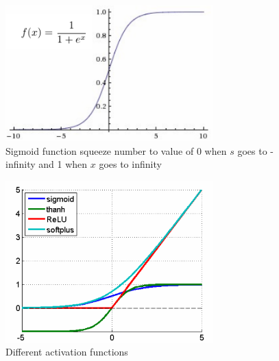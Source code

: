 \documentclass[conference]{IEEEtran}
\begin{document}
\begin{figure}[H]
    \centering
    \includegraphics[width=8cm]{sigmoid}
    \caption{Sigmoid function squeeze number to value of 0 when $s$ goes to -infinity and 1 when $x$ goes to infinity}
    \label{fig:fig6}
\end{figure}

\begin{figure}[H]
    \centering
    \includegraphics[width=8cm]{activator}
    \caption{Different activation functions}
    \label{fig:fig6}
\end{figure}
\end{document}
